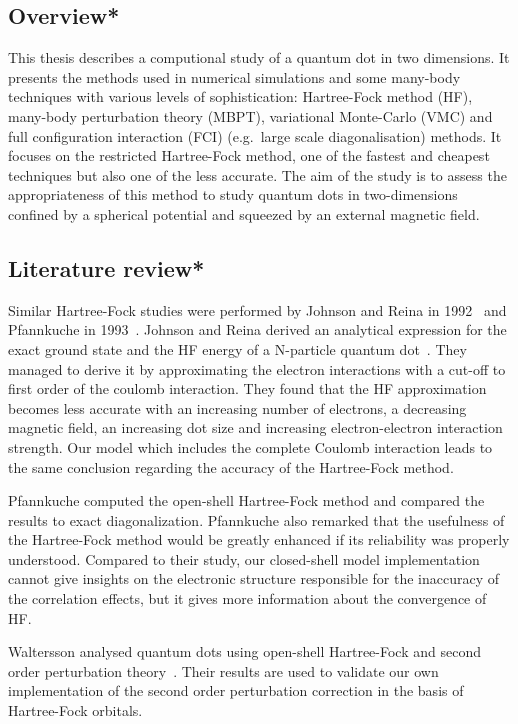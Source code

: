 \subsection{Overview*}
This thesis describes a computional study of a quantum dot in two dimensions. It presents the methods used in numerical simulations and some many-body techniques with various levels of sophistication: Hartree-Fock method (HF), many-body perturbation theory (MBPT), variational Monte-Carlo (VMC) and full configuration interaction (FCI) (e.g.\ large scale diagonalisation) methods. It focuses on the restricted Hartree-Fock method, one of the fastest and cheapest techniques but also one of the less accurate. The aim of the study is to assess the appropriateness of this method to study quantum dots in two-dimensions confined by a spherical potential and squeezed by an external magnetic field. 

\subsection{Literature review*}
Similar Hartree-Fock studies were performed by Johnson and Reina in 1992~\cite{johnsonReina1992} and Pfannkuche in 1993~\cite{pdgvmp1993}. 
Johnson and Reina derived an analytical expression for the exact ground state and the HF energy of a N-particle quantum dot~\cite{johnsonReina1992}. They managed to derive it by approximating the electron interactions with a cut-off to first order of the coulomb interaction.
They found that the HF approximation becomes less accurate with an increasing number of electrons, a decreasing magnetic field, an increasing dot size and increasing electron-electron interaction strength.
Our model which includes the complete Coulomb interaction leads to the same conclusion regarding the accuracy of the Hartree-Fock method.

Pfannkuche computed the open-shell Hartree-Fock method and compared the results to exact diagonalization. Pfannkuche also remarked that the usefulness of the Hartree-Fock method would be greatly enhanced if its reliability was properly understood\cite{pdgvmp1993}.
Compared to their study, our closed-shell model implementation cannot give insights on the electronic structure responsible for the inaccuracy of the correlation effects, but it gives more information about the convergence of HF. 

Waltersson analysed quantum dots using open-shell Hartree-Fock and second order perturbation theory~\cite{Waltersson2007}. Their results are used to validate our own implementation of the second order perturbation correction in the basis of Hartree-Fock orbitals. 

